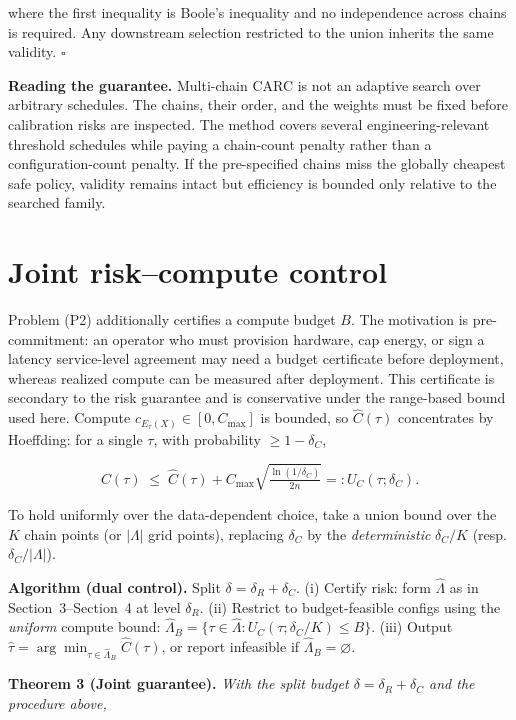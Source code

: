 \documentclass{ieeeaccess}
\begin{document}
where the first inequality is Boole's inequality and no independence across chains is required. Any downstream selection restricted to the union inherits the same validity. $\square$

\textbf{Reading the guarantee.} Multi-chain CARC is not an adaptive search over arbitrary schedules. The chains, their order, and the weights must be fixed before calibration risks are inspected. The method covers several engineering-relevant threshold schedules while paying a chain-count penalty rather than a configuration-count penalty. If the pre-specified chains miss the globally cheapest safe policy, validity remains intact but efficiency is bounded only relative to the searched family.

\section{Joint risk--compute control}

Problem (P2) additionally certifies a compute budget $B$. The motivation is pre-commitment: an operator who must provision hardware, cap energy, or sign a latency service-level agreement may need a budget certificate before deployment, whereas realized compute can be measured after deployment. This certificate is secondary to the risk guarantee and is conservative under the range-based bound used here. Compute $c_{E_\tau(X)}\in[0,C_{\max}]$ is bounded, so $\hat C(\tau)$ concentrates by Hoeffding: for a single $\tau$, with probability $\ge1-\delta_C$,

\[
C(\tau)\;\le\;\hat C(\tau)+C_{\max}\sqrt{\tfrac{\ln(1/\delta_C)}{2n}}=:U_C(\tau;\delta_C).
\]

To hold uniformly over the data-dependent choice, take a union bound over the $K$ chain points (or $|\Lambda|$ grid points), replacing $\delta_C$ by the \emph{deterministic} $\delta_C/K$ (resp. $\delta_C/|\Lambda|$).

\textbf{Algorithm (dual control).} Split $\delta=\delta_R+\delta_C$. (i) Certify risk: form $\hat\Lambda$ as in Section~3--Section~4 at level $\delta_R$. (ii) Restrict to budget-feasible configs using the \emph{uniform} compute bound: $\hat\Lambda_B=\{\tau\in\hat\Lambda: U_C(\tau;\delta_C/K)\le B\}$. (iii) Output $\hat\tau=\arg\min_{\tau\in\hat\Lambda_B}\hat C(\tau)$, or report infeasible if $\hat\Lambda_B=\varnothing$.

\textbf{Theorem 3 (Joint guarantee).} \emph{With the split budget $\delta=\delta_R+\delta_C$ and the procedure above,}
\end{document}
